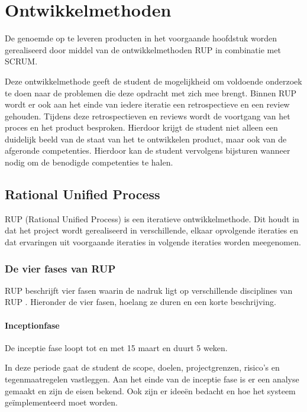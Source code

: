 \documentclass[a4paper, 11pt, oneside]{report}
\begin{document}
\chapter{Ontwikkelmethoden}
\label{chapter:ontwikkelmethode}
De genoemde op te leveren producten in het voorgaande hoofdstuk worden gerealiseerd door middel van de ontwikkelmethoden RUP in combinatie met SCRUM.

Deze ontwikkelmethode geeft de student de mogelijkheid om voldoende onderzoek te doen naar de problemen die deze opdracht met zich mee brengt. 
Binnen RUP wordt er ook aan het einde van iedere iteratie een retrospectieve en een review gehouden. Tijdens deze retrospectieven en reviews wordt de voortgang van het proces en het product besproken. Hierdoor krijgt de student niet alleen een duidelijk beeld van de staat van het te ontwikkelen product, maar ook van de afgeronde competenties. Hierdoor kan de student vervolgens bijsturen wanneer nodig om de benodigde competenties te halen.

\section{Rational Unified Process} 

RUP (Rational Unified Process) is een iteratieve ontwikkelmethode. Dit houdt in dat het project
wordt gerealiseerd in verschillende, elkaar opvolgende iteraties en dat ervaringen uit voorgaande iteraties in volgende iteraties worden meegenomen.\cite{RUP}

\subsection{De vier fases van RUP}
\label{sec:fasesRUP}
RUP beschrijft vier fasen waarin de nadruk ligt op verschillende disciplines van RUP \cite{RUPwim}.
Hieronder de vier fasen, hoelang ze duren en een korte beschrijving.

\subsubsection{Inceptionfase}
\label{sec:inceptionfase}
De inceptie fase loopt tot en met 15 maart en duurt 5 weken.

In deze periode gaat de student de scope, doelen, projectgrenzen, risico's en tegenmaatregelen vastleggen.
Aan het einde van de inceptie fase is er een analyse gemaakt en zijn de eisen bekend.
Ook zijn er ideeën bedacht en hoe het systeem geïmplementeerd moet worden.
\end{document}
